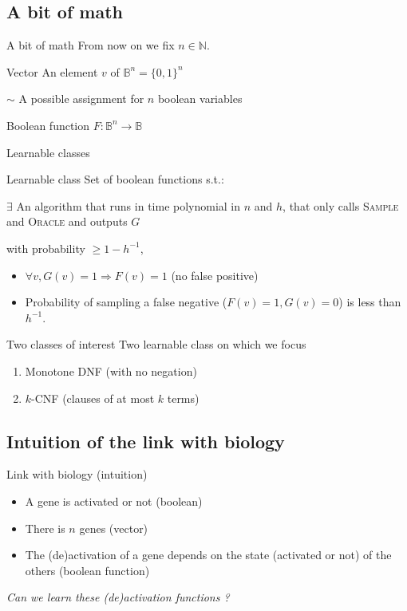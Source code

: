 \documentclass{beamer}
\begin{document}
\subsection{A bit of math}
\begin{frame}{A bit of math}
	From now on we fix $n \in \mathbb{N}$.
	\begin{block}{Vector}
	An element $v$ of $\mathbb{B}^n = \{0,1\}^n$
	\vspace{1em}
	
	$\sim$ A possible assignment for $n$ boolean variables
	\end{block}
\begin{block}{Boolean function}
	$F : \mathbb{B}^n \longrightarrow \mathbb{B}$
\end{block}
\end{frame}
\begin{frame}{Learnable classes}
\begin{block}{Learnable class}
		Set of boolean functions s.t.:
		\vspace{1em}
		
		$\exists$ An algorithm that runs in time polynomial in $n$ and $h$, that only calls \textsc{Sample} and \textsc{Oracle}
		\vspace{1em} and outputs $G$ 
		
		with probability $\geq 1 - h^{-1}$, 
		\begin{itemize}
			\item $\forall v, G(v) = 1 \Rightarrow F(v) = 1$ (no false positive)
			\item Probability of sampling a false negative ($F(v) = 1, G(v)=0$) is less than $h^{-1}$.
		\end{itemize}
\end{block}
\end{frame}
\begin{frame}{Two classes of interest}
Two learnable class on which we focus
\begin{enumerate}
	\item Monotone DNF (with no negation)
	\item $k$-CNF (clauses of at most $k$ terms)
\end{enumerate}
\end{frame}
\subsection{Intuition of the link with biology}
\begin{frame}{Link with biology (intuition)}
	\begin{itemize}
		\item A gene is activated or not (boolean)
		\item There is $n$ genes  (vector)
		\item The (de)activation of a gene depends on the state (activated or not) of the others (boolean function)
	\end{itemize}
\centering
\slshape
Can we learn these (de)activation functions ?
\end{frame}
\end{document}
